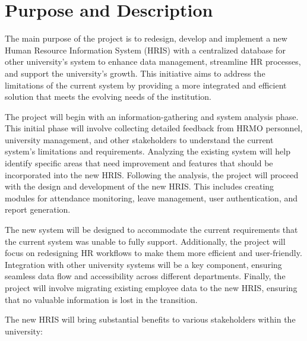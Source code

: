 \section{Purpose and Description}

    The main purpose of the project is to redesign, develop and implement a new Human Resource Information System (HRIS) with a centralized database for other university's system to enhance data management, streamline HR processes, and support the university's growth. This initiative aims to address the limitations of the current system by providing a more integrated and efficient solution that meets the evolving needs of the institution.

    The project will begin with an information-gathering and system analysis phase. This initial phase will involve collecting detailed feedback from HRMO personnel, university management, and other stakeholders to understand the current system's limitations and requirements. Analyzing the existing system will help identify specific areas that need improvement and features that should be incorporated into the new HRIS. Following the analysis, the project will proceed with the design and development of the new HRIS. This includes creating modules for attendance monitoring, leave management, user authentication, and report generation. 
    
    The new system will be designed to accommodate the current requirements that the current system was unable to fully support. Additionally, the project will focus on redesigning HR workflows to make them more efficient and user-friendly. Integration with other university systems will be a key component, ensuring seamless data flow and accessibility across different departments. Finally, the project will involve migrating existing employee data to the new HRIS, ensuring that no valuable information is lost in the transition.

    The new HRIS will bring substantial benefits to various stakeholders within the university:
    
